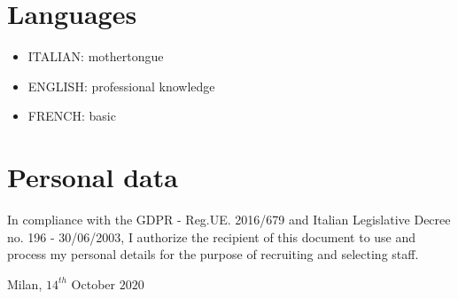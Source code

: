 \documentclass[11pt,a4paper,sans]{moderncv}        %
\begin{document}
\section{Languages}
\begin{itemize}
 \item ITALIAN: mothertongue
 \item ENGLISH: professional knowledge
 \item FRENCH: basic
\end{itemize} 

\section{Personal data}
In compliance with the GDPR - Reg.UE. 2016/679 and Italian Legislative Decree no. 196 - 30/06/2003, I authorize the recipient of this document to use and process my personal details for the purpose of recruiting and selecting staff. 


\bigskip 
\bigskip 
\bigskip 
\bigskip 
\bigskip 
\bigskip 
\bigskip 
\bigskip 
\bigskip 
\bigskip 
\bigskip 
\bigskip 
\bigskip 
\bigskip 
Milan, $14^{th}$ October $2020$
\end{document}
